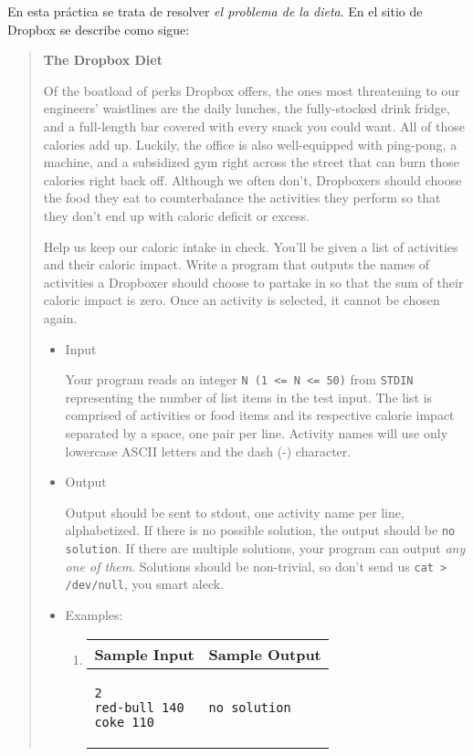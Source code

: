 En esta práctica se trata de resolver {\it el problema de la dieta}.
En el sitio de Dropbox se describe como sigue:

\begin{it}
\begin{quote}
{\bf The Dropbox Diet}

Of the boatload of perks Dropbox offers, the ones most threatening
to our engineers' waistlines are the daily lunches, the fully-stocked
drink fridge, and a full-length bar covered with every snack you
could want. All of those calories add up. Luckily, the office is
also well-equipped with ping-pong, a  machine, and a subsidized
gym right across the street that can burn those calories right back
off. Although we often don't, Dropboxers should choose the food
they eat to counterbalance the activities they perform so that they
don't end up with caloric deficit or excess.

Help us keep our caloric intake in check. You'll be given a list
of activities and their caloric impact. Write a program that outputs
the names of activities a Dropboxer should choose to partake in so
that the sum of their caloric impact is zero. Once an activity is
selected, it cannot be chosen again.

\begin{itemize}

\item Input

Your program reads an integer \verb|N (1 <= N <= 50)| from \verb|STDIN|
representing
the number of list items in the test input. The list is comprised
of activities or food items and its respective calorie impact
separated by a space, one pair per line. Activity names will use
only lowercase ASCII letters and the dash (-) character.


\item Output

Output should be sent to stdout, one activity name per line,
alphabetized. If there is no possible solution, the output should
be \verb|no solution|. If there are multiple solutions, your program can
output {\it any one of them}. Solutions should be non-trivial, so don't
send us \verb|cat > /dev/null|, you smart aleck.

\item  Examples:

\begin{enumerate}
\item
\begin{tabular}{|p{7cm}|p{5cm}|}
 Sample Input & Sample Output\\ \hline
\begin{verbatim}
2
red-bull 140
coke 110
\end{verbatim}
&
\begin{verbatim}
no solution
\end{verbatim}\\ \hline
\end{tabular}


\end{enumerate}
\end{itemize}
\end{quote}
\end{it}
